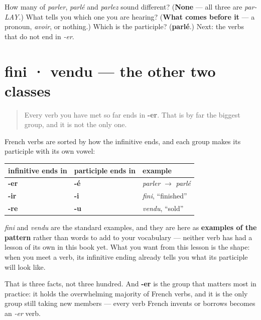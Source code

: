 \begin{tcolorbox}[breakable,colback=teal!4,colframe=teal!35!black,title={Before you move on}]
How many of \emph{parler}, \emph{parlé} and \emph{parlez} sound different? (\textbf{None} — all three are \emph{par-LAY}.) What tells you which one you are hearing? (\textbf{What comes before it} — a pronoun, \emph{avoir}, or nothing.) Which is the participle? (\textbf{parlé}.) Next: the verbs that do not end in \emph{-er}.
\end{tcolorbox}
\section[fini · vendu]{fini · vendu — the other two classes}

\label{lesson:FR-C15-participe-ir-re}



\begin{quote}
Every verb you have met so far ends in \textbf{-er}. That is by far the biggest group, and it is not the only one.
\end{quote}

\begin{grammarlens}[title={Grammar Lens: three classes, three vowels}]
French verbs are sorted by how the infinitive ends, and each group makes its participle with its own vowel:

\noindent
\begin{tabularx}{\linewidth}{@{}>{\raggedright\arraybackslash}X>{\raggedright\arraybackslash}X>{\raggedright\arraybackslash}X@{}}
\toprule
\textbf{infinitive ends in} & \textbf{participle ends in} & \textbf{example} \\
\midrule
\textbf{-er} & \textbf{-é} & \emph{parler} $\to$ \emph{parlé} \\
\textbf{-ir} & \textbf{-i} & \emph{fini}, \textquotedblleft{}finished\textquotedblright{} \\
\textbf{-re} & \textbf{-u} & \emph{vendu}, \textquotedblleft{}sold\textquotedblright{} \\
\bottomrule
\end{tabularx}

\emph{fini} and \emph{vendu} are the standard examples, and they are here as \textbf{examples of the pattern} rather than words to add to your vocabulary — neither verb has had a lesson of its own in this book yet. What you want from this lesson is the shape: when you meet a verb, its infinitive ending already tells you what its participle will look like.

That is three facts, not three hundred. And \textbf{-er} is the group that matters most in practice: it holds the overwhelming majority of French verbs, and it is the only group still taking new members — every verb French invents or borrows becomes an \emph{-er} verb.
\end{grammarlens}

